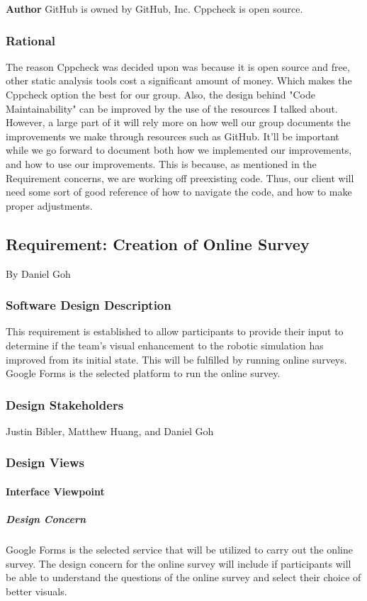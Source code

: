 \begin{flushleft}
\textbf{Author}
GitHub is owned by GitHub, Inc.
Cppcheck is open source.

\subsubsection{Rational}
The reason Cppcheck was decided upon was because it is open source and free, other static analysis tools cost a significant amount of money.
Which makes the Cppcheck option the best for our group.
Also, the design behind "Code Maintainability" can be improved by the use of the resources I talked about. 
However, a large part of it will rely more on how well our group documents the improvements we make through resources such as GitHub.
It'll be important while we go forward to document both how we implemented our improvements, and how to use our improvements.
This is because, as mentioned in the Requirement concerns, we are working off preexisting code.
Thus, our client will need some sort of good reference of how to navigate the code, and how to make proper adjustments.


\newpage
\subsection{Requirement: Creation of Online Survey}
\large{By Daniel Goh}

\normalsize
\subsubsection{Software Design Description}
This requirement is established to allow participants to provide their input to determine if the team's visual enhancement to the robotic simulation has improved from its initial state.
This will be fulfilled by running online surveys.
Google Forms is the selected platform to run the online survey.

\subsubsection{Design Stakeholders}
Justin Bibler, Matthew Huang, and Daniel Goh

\subsubsection{Design Views}
\paragraph{Interface Viewpoint}
\subparagraph{Design Concern}
Google Forms is the selected service that will be utilized to carry out the online survey. 
The design concern for the online survey will include if participants will be able to understand the questions of the online survey and select their choice of better visuals. 
\vspace{3mm}


\end{flushleft}
